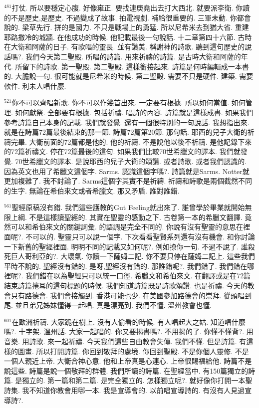 \documentclass{book}
\begin{document}
$^{481}$打仗.
所以要穩定心腹.
好像雍正.
要找連庚堯出去打大西北.
就要派李衛.
你讀的不是歷史,是歷史.
不過變成了故事.
拍電視劇.
補給很重要的.
三軍未動.
你都會說的.
梁草先行.
拼的是國力.
不只是戰場上的勇猛.
所以尼希米去到猶大省.
重建耶路撒冷的城牆.
在他成功的時候.
他記載最後一句說話.
十二章第四十六節.
古時在大衛和阿薩的日子.
有歌唱的靈長.
並有讚美.
稱謝神的詩歌.
聽到這句歷史的說話嗎?.
我們今天第二聖殿.
所唱的詩篇.
用來祈禱的詩篇.
是古時大衛和阿薩的年代.
所留下的詩歌.
第一聖殿.
第二聖殿.
這樣銜接起來.
詩篇是何時編輯成一本書的.
大膽說一句.
很可能就是尼希米的時候.
第二聖殿.
需要不只是硬件.
建築.
需要軟件.
利未人唱什麼.

$^{521}$你不可以齊唱新歌.
你不可以作幾首出來.
一定要有根據.
所以如何當值.
如何管理.
如何獻祭.
全部要有根據.
包括祈禱.
唱詩的內容.
詩篇就是這樣成書.
如果我們參考詩篇自己本身的記載.
我們就發覺.
還有一個很特別的一句說話.
我想指出來.
就是在詩篇72篇最後結束的那一節.
詩篇72篇第20節.
那句話.
耶西的兒子大衛的祈禱完畢.
大衛前面的72篇都是他的.
他的祈禱.
不是說他以後不祈禱.
是他記錄下來的72篇祈禱文.
停在72篇最後的這句.
如果我們比較70世希臘文的譯本.
我們就發覺.
70世希臘文的譯本.
是說耶西的兒子大衛的頌讚.
或者詩歌.
或者我們認識的.
因為英文也用了希臘文這個字.
Sarms.
認識這個字嗎?.
詩篇就是Sarms.
Notter就更加複雜了.
我不討論了.
Sarms這個字其實不是祈禱.
祈禱和詩歌是兩個截然不同的生字.
無論在希伯來文或者希臘文.
那又矛盾.
誰對誰錯.

$^{561}$聖經原稿沒有錯.
我們這些護教的Gut Feeling就出來了.
誰曾學於畢業就開始無限上綱.
不是這樣讀聖經的.
其實在聖靈的感動之下.
古卷第一本的希臘文翻譯.
竟然可以和希伯來文的關鍵詞彙.
的語調是完全不同的.
你說有沒有聖靈的意思在裡面呢?.
不可以的.
聖靈只可以說一個字.
下次看看聖賢系列還有沒有機會.
和你討論一下新舊的聖經裡面.
明明不同的記載又如何呢?.
例如撩你一句.
不過不說了.
誰殺死巨人哥利亞的?.
大壞氣.
你讀一下薩姆二記.
你不要只停在薩姆二記上.
這些我們平時不說的.
聖經沒有錯的.
是呀,聖經沒有錯的.
那誰錯呢?.
我們錯了.
我們錯在哪裡呢?.
我們錯在以為聖經只可以統一口徑.
希臘文和希伯來文.
在翻譯或是在72篇結束詩篇捲耳的這句標題的時候.
我們知道詩篇既是詩歌頌讚.
也是祈禱.
今天的教會只有路德會.
我們會接觸到.
香港可能也少.
在美國參加路德會的崇拜.
從頭唱到尾.
並且弟兄姊妹懂得一起唱.
真是漂亮到.
我們不懂.
溫州教會也懂.

$^{601}$在歐洲祈禱.
大家跪在樹上.
沒有人偷看的時候.
有人唱起大之姑.
知道唱什麼嗎?.
十字架.
溫州話.
大家一起唱的.
你又要揭書嗎?.
不用揭的了.
你懂不懂背?.
用音樂.
用詩歌.
來一起祈禱.
今天我們這些自由教會失傳.
我們不懂.
但是詩篇.
有這樣的圖畫.
所以打開詩篇.
你回到敬拜的處境.
你回到聖殿.
不是你個人靈修.
不是一個人親近上帝.
大衛合神心意.
他和上帝真是心連心.
上帝很賜福給他.
詩篇不是說這些.
詩篇是說一個敬拜的群體.
我們所讀的詩篇.
在聖經當中.
有150篇獨立的詩篇.
是獨立的.
第一篇和第二篇.
是完全獨立的.
怎樣獨立呢?.
就好像你打開一本聖詩集.
我不知道你教會用哪一本.
我是宣導會的.
以前唱宣導詩的.
有沒有人見過宣導詩?.
\end{document}
